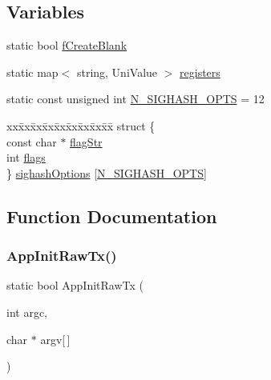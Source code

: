 \subsection*{Variables}
\begin{DoxyCompactItemize}
\item 
static bool \mbox{\hyperlink{bitcoin-tx_8cpp_a890917ae6f4a5724fd5c0e2a09b47e37}{f\+Create\+Blank}}
\item 
static map$<$ string, Uni\+Value $>$ \mbox{\hyperlink{bitcoin-tx_8cpp_a33a45ded721d1370234b3c02015c88bf}{registers}}
\item 
static const unsigned int \mbox{\hyperlink{bitcoin-tx_8cpp_a14abf0291b87d0f4e1ff4d5651293cfd}{N\+\_\+\+S\+I\+G\+H\+A\+S\+H\+\_\+\+O\+P\+TS}} = 12
\item 
\begin{tabbing}
xx\=xx\=xx\=xx\=xx\=xx\=xx\=xx\=xx\=\kill
struct \{\\
\>const char $\ast$ \mbox{\hyperlink{bitcoin-tx_8cpp_a4c63caa32881965b29b571644c25ef2a}{flagStr}}\\
\>int \mbox{\hyperlink{bitcoin-tx_8cpp_ac8bf36fe0577cba66bccda3a6f7e80a4}{flags}}\\
\} \mbox{\hyperlink{bitcoin-tx_8cpp_a088e9062815ab3c56f368183297c6a4a}{sighashOptions}} \mbox{[}\mbox{\hyperlink{bitcoin-tx_8cpp_a14abf0291b87d0f4e1ff4d5651293cfd}{N\_SIGHASH\_OPTS}}\mbox{]}\\

\end{tabbing}\end{DoxyCompactItemize}


\subsection{Function Documentation}
\mbox{\label{bitcoin-tx_8cpp_affd2ff3bf9c0ed318f1f4d826d5e8098}} 
\subsubsection{\texorpdfstring{App\+Init\+Raw\+Tx()}{AppInitRawTx()}}
{\footnotesize\ttfamily static bool App\+Init\+Raw\+Tx (\begin{DoxyParamCaption}\item[{int}]{argc,  }\item[{char $\ast$}]{argv\mbox{[}$\,$\mbox{]} }\end{DoxyParamCaption})\hspace{0.3cm}{\ttfamily [static]}}


